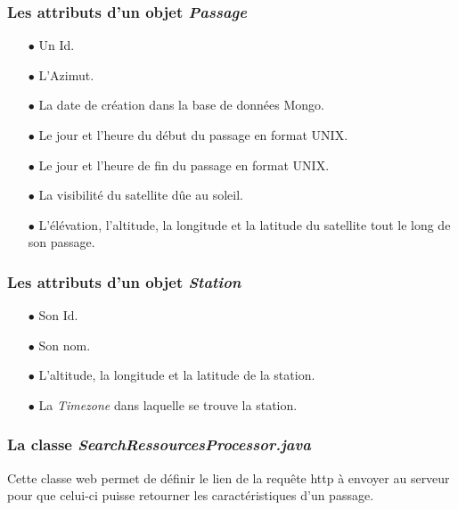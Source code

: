 \documentclass[12pt,fleqn]{book} %
\begin{document}
\subsubsection{Les attributs d'un objet \emph{Passage}}
\begin{itemize}
 \item[$\bullet$] Un Id.
 \item[$\bullet$] L'Azimut.
 \item[$\bullet$] La date de création dans la base de données Mongo.
 \item[$\bullet$] Le jour et l'heure du début du passage en format UNIX.
 \item[$\bullet$] Le jour et l'heure de fin du passage en format UNIX.
 \item[$\bullet$] La visibilité du satellite dûe au soleil.
 \item[$\bullet$] L'élévation, l'altitude, la longitude et la latitude du satellite tout le long de son passage.
\end{itemize}
\subsubsection{Les attributs d'un objet \emph{Station}}
\begin{itemize}
 \item[$\bullet$] Son Id.
 \item[$\bullet$] Son nom.
 \item[$\bullet$] L'altitude, la longitude et la latitude de la station.
 \item[$\bullet$] La \emph{Timezone} dans laquelle se trouve la station.
\end{itemize}
\subsubsection{La classe \emph{SearchRessourcesProcessor.java}}
\noindent Cette classe web permet de définir le lien de la requête http à envoyer au serveur pour que celui-ci puisse retourner les caractéristiques d'un passage.
\end{document}
